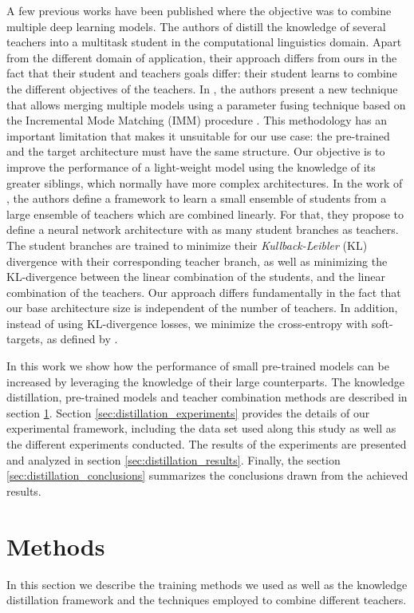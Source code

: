 A few previous works have been published where the objective was to combine multiple deep learning models. The authors of \cite{liu2020b} distill the knowledge of several teachers into a multitask student in the computational linguistics domain. Apart from the different domain of application, their approach differs from ours in the fact that their student and teachers goals differ: their student learns to combine the different objectives of the teachers. In \cite{geyer2019}, the authors present a new technique that allows merging multiple models using a parameter fusing technique based on the Incremental Mode Matching (IMM) procedure \cite{lee2017}. This methodology has an important limitation that makes it unsuitable for our use case: the pre-trained and the target architecture must have the same structure. Our objective is to improve the performance of a light-weight model using the knowledge of its greater siblings, which normally have more complex architectures. In the work of \cite{asif2019}, the authors define a framework to learn a small ensemble of students from a large ensemble of teachers which are combined linearly. For that, they propose to define a neural network architecture with as many student branches as teachers. The student branches are trained to minimize their \textit{Kullback-Leibler} (KL) divergence with their corresponding teacher branch, as well as minimizing the KL-divergence between the linear combination of the students, and the linear combination of the teachers. Our approach differs fundamentally in the fact that our base architecture size is independent of the number of teachers. In addition, instead of using KL-divergence losses, we minimize the cross-entropy with soft-targets, as defined by \cite{hinton2015}.

In this work we show how the performance of small pre-trained models can be increased by leveraging the knowledge of their large counterparts. The knowledge distillation, pre-trained models and teacher combination methods are described in section  \ref{sec:distillation_methods}. Section \ref{sec:distillation_experiments} provides the details of our experimental framework, including the data set used along this study as well as the different experiments conducted. The results of the experiments are presented and analyzed in section \ref{sec:distillation_results}. Finally, the section \ref{sec:distillation_conclusions} summarizes the conclusions drawn from the achieved results.

\section{Methods} \label{sec:distillation_methods}
In this section we describe the training methods we used as well as the knowledge distillation framework and the techniques employed to combine different teachers.

